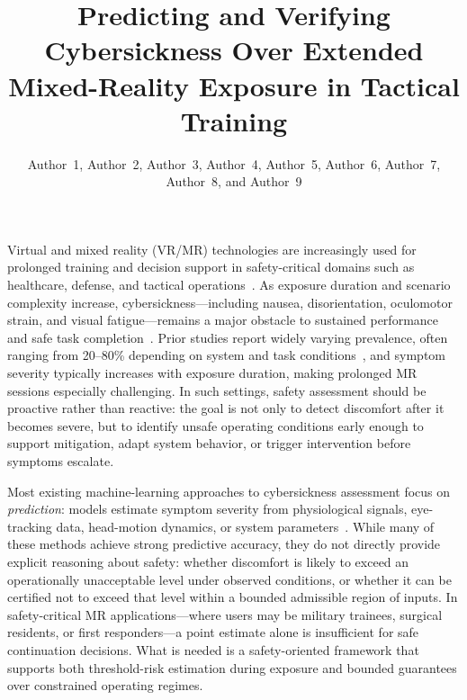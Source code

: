 \documentclass[review]{vgtc}              %
\title{Predicting and Verifying Cybersickness Over Extended Mixed-Reality Exposure in Tactical Training}
\author{%
  Author~1,
  Author~2,
  Author~3,
  Author~4,
  Author~5,
  Author~6,
  Author~7,
  Author~8,
  and Author~9
}
\begin{document}


\maketitle

\label{sec:intro}
Virtual and mixed reality (VR/MR) technologies are increasingly used for prolonged training and decision support in safety-critical domains such as healthcare, defense, and tactical operations~\cite{Harper2021AR, Stanney2022AUGMED}. As exposure duration and scenario complexity increase, cybersickness---including nausea, disorientation, oculomotor strain, and visual fatigue---remains a major obstacle to sustained performance and safe task completion~\cite{Rebenitsch2016Review, LaViola2000Cybersickness,Ahmed:2025:XRReview}. Prior studies report widely varying prevalence, often ranging from 20--80\% depending on system and task conditions~\cite{Stanney1997HumanFactors}, and symptom severity typically increases with exposure duration, making prolonged MR sessions especially challenging. In such settings, safety assessment should be proactive rather than reactive: the goal is not only to detect discomfort after it becomes severe, but to identify unsafe operating conditions early enough to support mitigation, adapt system behavior, or trigger intervention before symptoms escalate.

Most existing machine-learning approaches to cybersickness assessment focus on \emph{prediction}: models estimate symptom severity from physiological signals, eye-tracking data, head-motion dynamics, or system parameters~\cite{Jeong2019EEG, qi2025cpnet, GarciaAgundez2019Classifier}. While many of these methods achieve strong predictive accuracy, they do not directly provide explicit reasoning about safety: whether discomfort is likely to exceed an operationally unacceptable level under observed conditions, or whether it can be certified not to exceed that level within a bounded admissible region of inputs. In safety-critical MR applications---where users may be military trainees, surgical residents, or first responders---a point estimate alone is insufficient for safe continuation decisions. What is needed is a safety-oriented framework that supports both threshold-risk estimation during exposure and bounded guarantees over constrained operating regimes.
\end{document}
